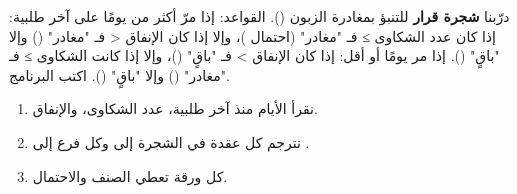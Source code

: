 \begin{statement}
درّبنا \textbf{شجرة قرار} للتنبؤ بمغادرة الزبون (). القواعد: إذا مرّ أكثر من  يومًا على آخر طلبية: إذا كان عدد الشكاوى ≥  فـ "مغادر" (احتمال )، وإلا إذا كان الإنفاق <  فـ "مغادر" () وإلا "باقٍ" (). إذا مر  يومًا أو أقل: إذا كان الإنفاق >  فـ "باقٍ" ()، وإلا إذا كانت الشكاوى ≥  فـ "مغادر" () وإلا "باقٍ" (). اكتب البرنامج.
\end{statement}
\begin{stepsbox}\begin{enumerate}
\item نقرأ الأيام منذ آخر طلبية، عدد الشكاوى، والإنفاق.
\item نترجم كل عقدة في الشجرة إلى  وكل فرع إلى .
\item كل ورقة تعطي الصنف والاحتمال.
\end{enumerate}\end{stepsbox}

